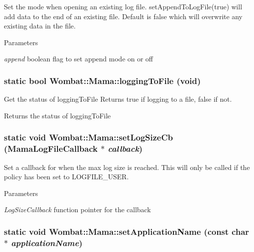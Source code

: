 Set the mode when opening an existing log file. setAppendToLogFile(true) will add data to the end of an existing file. Default is false which will overwrite any existing data in the file. 
\begin{DoxyParams}{Parameters}
\item[{\em append}]boolean flag to set append mode on or off \end{DoxyParams}
\hypertarget{classWombat_1_1Mama_a2bbe43b4c5dd0b748ee78521917072e2}{
\subsubsection[{loggingToFile}]{\setlength{\rightskip}{0pt plus 5cm}static bool Wombat::Mama::loggingToFile (void)}}
\label{classWombat_1_1Mama_a2bbe43b4c5dd0b748ee78521917072e2}


Get the status of loggingToFile Returns true if logging to a file, false if not. \begin{DoxyReturn}{Returns}
the status of loggingToFile 
\end{DoxyReturn}
\hypertarget{classWombat_1_1Mama_af6d0cdfc8a039b09c5a6af9dda5acada}{
\subsubsection[{setLogSizeCb}]{\setlength{\rightskip}{0pt plus 5cm}static void Wombat::Mama::setLogSizeCb ({\bf MamaLogFileCallback} $\ast$ {\em callback})}}
\label{classWombat_1_1Mama_af6d0cdfc8a039b09c5a6af9dda5acada}


Set a callback for when the max log size is reached. This will only be called if the policy has been set to LOGFILE\_\-USER. 
\begin{DoxyParams}{Parameters}
\item[{\em LogSizeCallback}]function pointer for the callback \end{DoxyParams}
\hypertarget{classWombat_1_1Mama_aa300e6f36cc4f9efb6099550a5657149}{
\subsubsection[{setApplicationName}]{\setlength{\rightskip}{0pt plus 5cm}static void Wombat::Mama::setApplicationName (const char $\ast$ {\em applicationName})}}
\label{classWombat_1_1Mama_aa300e6f36cc4f9efb6099550a5657149}


